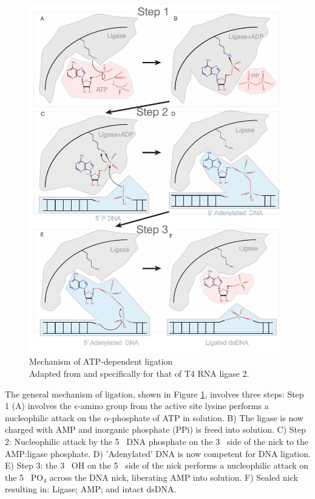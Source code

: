 \begin{figure}[htbp]
	\centering 
	\includegraphics{Figures/LigationMechanism.pdf}
	\caption[Mechanism of Rnl2 ATP-dependent ligation]
	{
		Mechanism of ATP-dependent ligation\\[0.25cm]
		Adapted from \citep{Nandakumar2006} and specifically for that of T4 RNA ligase 2.
	}
	\label{fig:Ligation Mechanism}
\end{figure}

The general mechanism of ligation, shown in Figure \ref{fig:Ligation Mechanism}, involves three steps: Step 1 (A) involves the $\epsilon$-amino group from the active site lysine performs a nucleophilic attack on the $\alpha$-phosphate of ATP in solution.  B) The ligase is now charged with AMP and inorganic phosphate (PPi) is freed into solution. C) Step 2: Nucleophilic attack by the 5\textprime~ DNA phosphate on the 3\textprime~ side of the nick to the AMP:ligase phosphate. D) 'Adenylated' DNA is now competent for DNA ligation. E) Step 3: the 3\textprime~ OH on the 5\textprime~ side of the nick performs a nucleophilic attack on the 5\textprime~ PO$_{4}$ across the DNA nick, liberating AMP into solution. F) Sealed nick resulting in: Ligase; AMP; and intact dsDNA.

